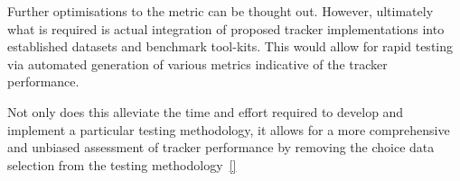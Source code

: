 Further optimisations to the metric can be thought out. However, ultimately what
is required is actual integration of proposed tracker implementations into established
datasets and benchmark tool-kits. This would allow for rapid testing via
automated generation of various metrics indicative of the tracker performance.

Not only does this alleviate the time and effort required to develop and
implement a particular testing methodology, it allows for a more comprehensive
and unbiased assessment of tracker performance by removing the choice data
selection from the testing methodology~\ref{}



